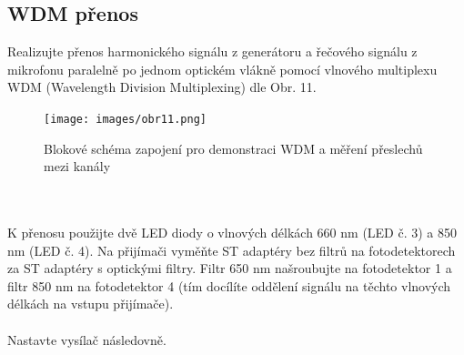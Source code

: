 \subsection{WDM přenos}
Realizujte přenos harmonického signálu z generátoru a řečového signálu z mikrofonu paralelně po jednom optickém vlákně pomocí vlnového multiplexu WDM (Wavelength Division Multiplexing) dle Obr. 11.
\begin{figure}[h]
\centering
\texttt{[image: images/obr11.png]}
\caption{Blokové schéma zapojení pro demonstraci WDM a měření přeslechů mezi kanály}
\label{fig:11}
\end{figure}
\\\\
K přenosu použijte dvě LED diody o vlnových délkách 660 nm (LED č. 3) a 850 nm (LED č. 4). Na přijímači vyměňte ST adaptéry bez filtrů na fotodetektorech za ST adaptéry s optickými filtry. Filtr 650 nm našroubujte na fotodetektor 1 a filtr 850 nm na fotodetektor 4 (tím docílíte oddělení signálu na těchto vlnových délkách na vstupu přijímače).
\\\\
Nastavte vysílač následovně.
